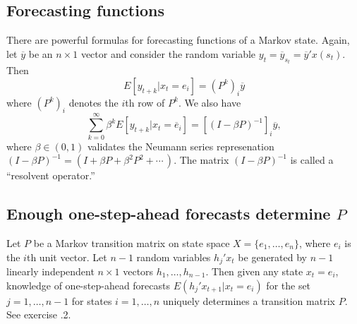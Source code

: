 \subsection{Forecasting functions}\label{sec:resolvent}%
 There are powerful formulas for forecasting functions
of a Markov state.
   Again, let $\overline y $ be an $n\times 1$ vector and
consider the random variable $y_t = \overline y_{s_t} =  \overline y' x(s_t)$.
Then
$$ E[y_{t+k} \vert x_t = e_i] =  (P^k)_i \overline y $$
where $(P^k)_i$ denotes the $i$th row of $P^k$.
We also have
$$  \sum_{k=0}^\infty \beta^k E [y_{t+k}  \vert x_t =
    \overline e_i ]
       = [ (I -\beta P)^{-1}]_i  \overline y ,$$
where $\beta \in (0,1)$ validates the Neumann series represenation $(I -\beta P)^{-1}
= (I + \beta P + \beta^2 P^2 + \cdots \, )$.
The matrix $(I -\beta P)^{-1}$ is called a ``resolvent operator.''
%
%



\subsection{Enough one-step-ahead forecasts determine $P$}
Let $P$ be a Markov transition matrix on state space $X = \{ e_1, \ldots, e_n\}$,
where $e_i$ is the $i$th unit vector.  Let  $n-1$  random variables $h_j' x_t$ be
generated by $n-1$ linearly independent $n \times 1$ vectors $h_1, \ldots, h_{n-1}$.
Then given any state $x_t = e_i$, knowledge of one-step-ahead forecasts $E (h_j' x_{t+1} | x_t = e_i)$ for %
the set $j = 1, \ldots, n-1$ for states $i = 1, \ldots, n$ uniquely determines a transition matrix $P$.  See exercise  \the\chapternum.2.


